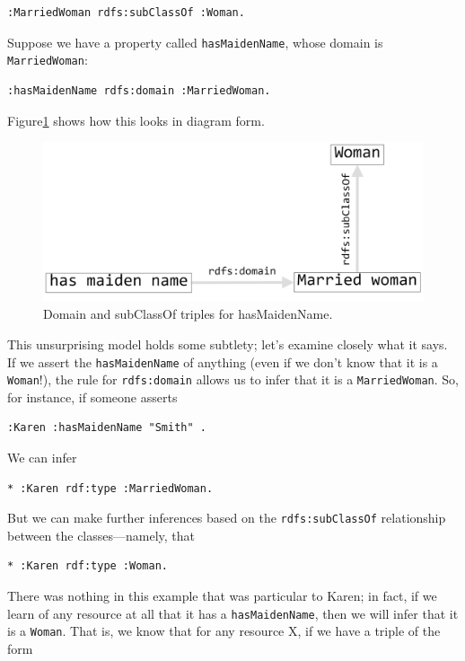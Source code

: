 \begin{lstlisting}
:MarriedWoman rdfs:subClassOf :Woman.
\end{lstlisting}

Suppose we have a property called \texttt{hasMaidenName}, whose domain is
\texttt{MarriedWoman}:

\begin{lstlisting}
:hasMaidenName rdfs:domain :MarriedWoman.
\end{lstlisting}

Figure\ref{fig:ch8.2} shows how this looks in diagram form.

\begin{figure}
\centering
\includegraphics[width=5in]{SWWOv3/media/ch8/figure8-2.png}
\caption{Domain and subClassOf triples for hasMaidenName.}
\label{fig:ch8.2}
\end{figure}


This unsurprising model holds some subtlety; let's examine closely what
it says. If we assert the \texttt{hasMaidenName} of anything (even if we don't
know that it is a \texttt{Woman}!), the rule for \texttt{rdfs:domain} allows us to infer
that it is a \texttt{MarriedWoman}. So, for instance, if someone asserts

\begin{lstlisting}
:Karen :hasMaidenName "Smith" .
\end{lstlisting}

We can infer

\begin{lstlisting}
* :Karen rdf:type :MarriedWoman.
\end{lstlisting}

But we can make further inferences based on the \texttt{rdfs:subClassOf}
relationship between the classes---namely, that

\begin{lstlisting}
* :Karen rdf:type :Woman.
\end{lstlisting}

There was nothing in this example that was particular to Karen; in fact,
if we learn of any resource at all that it has a \texttt{hasMaidenName}, then we
will infer that it is a \texttt{Woman}. That is, we know that for any resource X,
if we have a triple of the form

